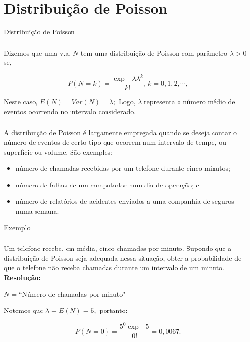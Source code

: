 \documentclass[14pt,aspectratio=1610]{beamer}
\begin{document}
\section{Distribuição de Poisson}
\begin{frame}{Distribuição de Poisson}
\frametitle{}
\begin{block}{}
\justifying
Dizemos que uma v.a. $N$ tem uma distribuição de Poisson com parâmetro
$\lambda > 0$ se,

$$P(N=k)=\dfrac{\exp{-\lambda}\lambda^{k}}{k!},\ k=0,1,2,\cdots,$$

Neste caso, $E(N)=Var(N)=\lambda;$ Logo, $\lambda$ representa o número médio de eventos ocorrendo no intervalo considerado.

\end{block}
\end{frame}

\begin{frame}{}
\frametitle{}
\begin{block}{}
\justifying
A distribuição de Poisson é largamente empregada quando se deseja contar o número
de eventos de certo tipo que ocorrem num intervalo de tempo, ou superfície ou 
volume. São exemplos:
\begin{itemize}
\item número de chamadas recebidas por um telefone durante cinco minutos;
\item número de falhas de um computador num dia de operação; e
\item número de relatórios de acidentes enviados a uma companhia de seguros numa
semana.
\end{itemize}
\end{block}
\end{frame}

\begin{frame}{Exemplo}
\frametitle{}
\begin{block}{}
\justifying
Um telefone recebe, em média, cinco chamadas por minuto. Supondo que a distribuição de Poisson seja adequada nessa situação, obter a probabilidade de que o telefone não receba chamadas durante um intervalo de um minuto.
\pause
{\bf Resolução:}

$N=$``Número de chamadas por minuto"

Notemos que $\lambda=E(N)=5,$ portanto:

$$P(N=0)=\dfrac{5^{0}\exp{-5}}{0!}=0,0067.$$

\end{block}
\end{frame}
\end{document}
